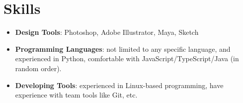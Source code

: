 \documentclass{resume}
\newcommand{\en}[1]{#1}
\newcommand{\zh}[1]{}
\begin{document}
\section{\en{Skills}\zh{技能}}
\begin{itemize}[parsep=0.25ex]
      \item \en{\textbf{Design Tools}:
                  Photoshop, Adobe Illustrator, Maya, Sketch}
            \zh{\textbf{设计软件}:
                  Photoshop，Adobe Illustrator，Maya，Sketch}
                  
      \item \en{\textbf{Programming Languages}:
                  not limited to any specific language,
                  and experienced in Python,
                  comfortable with JavaScript/TypeScript/Java (in random order).}
            \zh{\textbf{编程语言}:
                  不局限于特定编程语言，且尤其熟悉 JavaScript 等，
                  了解 Java/Python/Kotlin/TypeScript 等（不分先后）。}

      \item \en{\textbf{Developing Tools}:
                  experienced in Linux-based programming,
                  have experience with team tools like Git, etc.}
            \zh{\textbf{开发工具}:
                  十分熟悉 Linux，有 Git 等团队合作工具的经验。}
\end{itemize}
\end{document}
